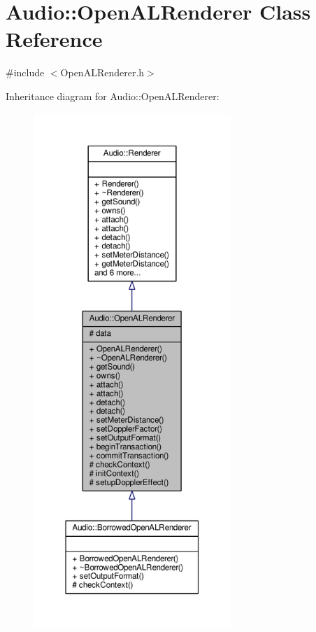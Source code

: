 \hypertarget{classAudio_1_1OpenALRenderer}{}\section{Audio\+:\+:Open\+A\+L\+Renderer Class Reference}
\label{classAudio_1_1OpenALRenderer}


{\ttfamily \#include $<$Open\+A\+L\+Renderer.\+h$>$}



Inheritance diagram for Audio\+:\+:Open\+A\+L\+Renderer\+:
\nopagebreak
\begin{figure}[H]
\begin{center}
\leavevmode
\includegraphics[height=550pt]{d8/d13/classAudio_1_1OpenALRenderer__inherit__graph}
\end{center}
\end{figure}



